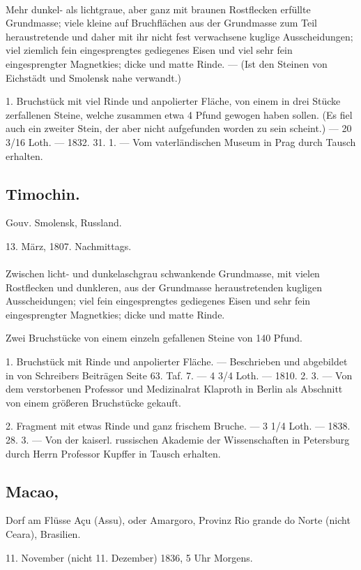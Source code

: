 \documentclass[a4paper, 11pt, oneside, polutonikogreek, german]{article}
\begin{document}
\paragraph{}
Mehr dunkel- als lichtgraue, aber ganz mit braunen Rostflecken erfüllte Grundmasse; viele kleine auf Bruchflächen aus der Grundmasse zum Teil heraustretende und daher mit ihr nicht fest verwachsene kuglige Ausscheidungen; viel ziemlich fein eingesprengtes gediegenes Eisen und viel sehr fein eingesprengter Magnetkies; dicke und matte Rinde. — (Ist den Steinen von Eichstädt und Smolensk nahe verwandt.)

1. Bruchstück mit viel Rinde und anpolierter Fläche, von einem in drei Stücke zerfallenen Steine, welche zusammen etwa 4 Pfund gewogen haben sollen. (Es fiel auch ein zweiter Stein, der aber nicht aufgefunden worden zu sein scheint.) — 20 3/16 Loth. — 1832. 31. 1. — Vom vaterländischen Museum in Prag durch Tausch erhalten.
\subsection{Timochin.}
\begin{center}
\small
Gouv. Smolensk, Russland.

13. März, 1807. Nachmittags.
\end{center}
\paragraph{}
Zwischen licht- und dunkelaschgrau schwankende Grundmasse, mit vielen Rostflecken und dunkleren, aus der Grundmasse heraustretenden kugligen Ausscheidungen; viel fein eingesprengtes gediegenes Eisen und sehr fein eingesprengter Magnetkies; dicke und matte Rinde.

Zwei Bruchstücke von einem einzeln gefallenen Steine von 140 Pfund.

1. Bruchstück mit Rinde und anpolierter Fläche. — Beschrieben und abgebildet in von Schreibers Beiträgen Seite 63. Taf. 7. — 4 3/4 Loth. — 1810. 2. 3. — Von dem verstorbenen Professor und Medizinalrat Klaproth in Berlin als Abschnitt von einem größeren Bruchstücke gekauft.

2. Fragment mit etwas Rinde und ganz frischem Bruche. — 3 1/4 Loth. — 1838. 28. 3. — Von der kaiserl. russischen Akademie der Wissenschaften in Petersburg durch Herrn Professor Kupffer in Tausch erhalten.
\subsection[Macao.]{Macao,}
\begin{center}
\small
Dorf am Flüsse Açu (Assu), oder Amargoro, Provinz Rio grande do Norte (nicht Ceara), Brasilien.

11. November (nicht 11. Dezember) 1836, 5 Uhr Morgens.
\end{center}
\end{document}
